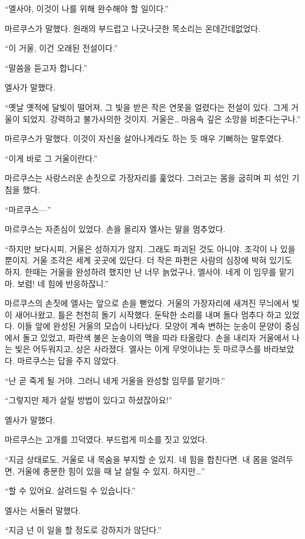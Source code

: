 ``엘사야, 이것이 나를 위해 완수해야 할 일이다.''

마르쿠스가 말했다. 원래의 부드럽고 나긋나긋한 목소리는 온데간데없었다.

``이 거울, 이건 오래된 전설이다.''

``말씀을 듣고자 합니다.''

엘사가 말했다.

``옛날 옛적에 달빛이 떨어져, 그 빛을 받은 작은 연못을 얼렸다는 전설이 있다. 그게 거울이 되었지. 강력하고 불가사의한 것이지. 거울은\ldots\,마음속 깊은 소망을 비춘다는구나.''

마르쿠스가 말했다. 이것이 자신을 살아나게라도 하는 듯 매우 기뻐하는 말투였다.

``이게 바로 그 거울이란다.''

마르쿠스는 사랑스러운 손짓으로 가장자리를 훑었다. 그러고는 몸을 굽히며 피 섞인 기침을 했다.

``마르쿠스—''

마르쿠스는 자존심이 있었다. 손을 올리자 엘사는 말을 멈추었다.

``하지만 보다시피, 거울은 성하지가 않지. 그래도 파괴된 것도 아니야. 조각이 나 있을 뿐이지. 거울 조각은 세계 곳곳에 있단다. 더 작은 파편은 사람의 심장에 박혀 있기도 하지. 한때는 거울을 완성하려 했지만 난 너무 늙었구나, 엘사야. 네게 이 임무를 맡기마. 보렴! 네 힘에 반응하잖니.''

마르쿠스의 손짓에 엘사는 앞으로 손을 뻗었다. 거울의 가장자리에 새겨진 무늬에서 빛이 새어나왔고, 틀은 천천히 돌기 시작했다. 둔탁한 소리를 내며 돌다 멈추다 하고 있었다. 이들 앞에 완성된 거울의 모습이 나타났다. 모양이 계속 변하는 눈송이 문양이 중심에서 돌고 있었고, 파란색 불은 눈송이의 맥을 따라 타올랐다. 손을 내리자 거울에서 나는 빛은 어두워지고, 상은 사라졌다. 엘사는 이게 무엇이냐는 듯 마르쿠스를 바라보았다. 마르쿠스는 답을 주지 않았다.

``난 곧 죽게 될 거야. 그러니 네게 거울을 완성할 임무를 맡기마.''

``그렇지만 제가 살릴 방법이 있다고 하셨잖아요!''

엘사가 말했다.

마르쿠스는 고개를 끄덕였다. 부드럽게 미소를 짓고 있었다.

``지금 상태로도, 거울로 내 목숨을 부지할 순 있지. 네 힘을 합친다면. 내 몸을 얼려두면, 거울에 충분한 힘이 있을 때 날 살릴 수 있지. 하지만\ldots''

``할 수 있어요. 살려드릴 수 있습니다.''

엘사는 서둘러 말했다.

``지금 넌 이 일을 할 정도로 강하지가 않단다.''

